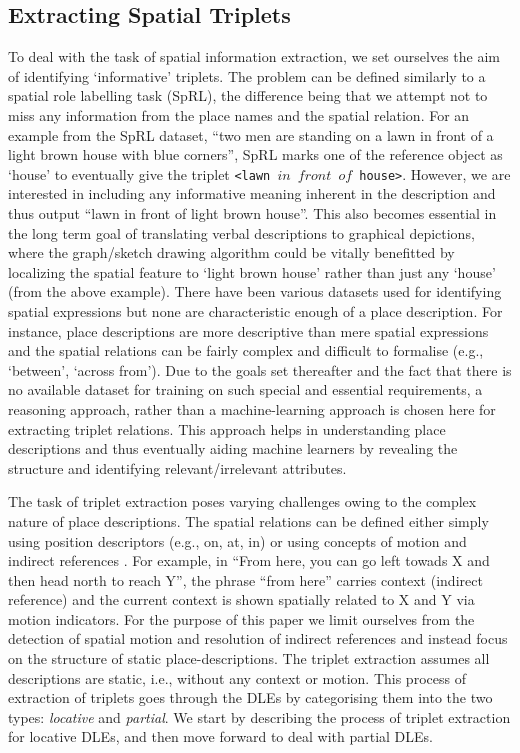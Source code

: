 \documentclass[letter]{sig-alternate}
\begin{document}
\subsection{Extracting Spatial Triplets}
To deal with the task of spatial information extraction, we set ourselves the aim of identifying `informative' triplets. The problem can be defined similarly to a spatial role labelling task (SpRL), the difference being that we attempt not to miss any information from the place names and the spatial relation. For an example from the SpRL dataset, ``two men are standing on a lawn in front of a light brown house with blue corners'', SpRL marks one of the reference object as `house' to eventually give the triplet \texttt{<lawn $in$ $front$ $of$  house>}. However, we are interested in including any informative meaning inherent in the description and thus output ``lawn in front of light brown house''. This also becomes essential in the long term goal of translating verbal descriptions to graphical depictions, where the graph/sketch drawing algorithm could be vitally benefitted by localizing the spatial feature to `light brown house' rather than just any `house' (from the above example). There have been various datasets used for identifying spatial expressions \cite{Bateman:data,CLEF:data, parisa:semeval}  but none are characteristic enough of a place description. For instance, place descriptions are more descriptive than mere spatial expressions and the spatial relations can be fairly complex and difficult to formalise (e.g., `between', `across from').  Due to the goals set thereafter and the fact that there is no available dataset for training on such special and essential requirements, a reasoning approach, rather than a machine-learning approach is chosen here for extracting triplet relations. This approach helps in understanding place descriptions and thus eventually aiding machine learners by revealing the structure and identifying relevant/irrelevant attributes.

The task of triplet extraction poses varying challenges owing to the complex nature of place descriptions. The spatial relations can be defined either simply using position descriptors (e.g., on, at, in) or using concepts of motion and indirect references \cite{zlatev:semantics}. For example, in ``From here, you can go left towads X and then head north to reach Y'', the phrase ``from here'' carries context (indirect reference) and the current context is shown spatially related to X and Y via motion indicators. For the purpose of this paper we limit ourselves from the detection of spatial motion and resolution of indirect references and instead focus on the structure of static place-descriptions. The triplet extraction assumes all descriptions are static, i.e., without any context or motion. This process of extraction of triplets goes through the DLEs by categorising them into the two types: \textit{locative} and \textit{partial}. We start by describing the process of triplet extraction for locative DLEs, and then move forward to deal with partial DLEs.
\end{document}

